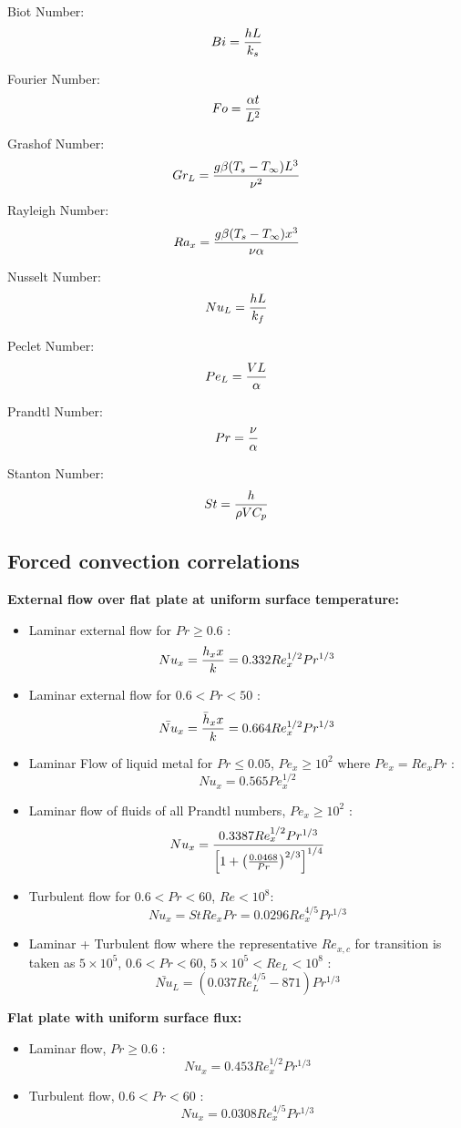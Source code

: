 Biot Number: $$ Bi = {h L \over k_s}$$

Fourier Number: $$Fo = {\alpha t \over L^2}$$

Grashof Number: $$Gr_L = {g \beta (T_s - T_\infty) L^3 \over \nu^2 }$$

Rayleigh Number: $$Ra_x = {g \beta (T_s - T_\infty) x^3 \over \nu \alpha}$$

Nusselt Number: $$Nu_L = {h L \over k_f}$$

Peclet Number: $$Pe_L = {V L \over \alpha}$$

Prandtl Number: $$Pr = {\nu \over \alpha}$$

Stanton Number: $$St = {h \over \rho V C_p}$$


\begin{center}
\section{Forced convection correlations}
\end{center}


{\bf External flow over flat plate at uniform surface temperature:}\\
\begin{itemize}
 \item Laminar external flow for $Pr \ge 0.6$ : 
      $$Nu_x = {h_x x \over k} = 0.332 Re_x^{1/2} Pr^{1/3}$$
 \item Laminar external flow for $0.6 < Pr < 50$ : 
      $$\bar{Nu}_x = {\bar{h}_x x \over k} = 0.664 Re_x^{1/2} Pr^{1/3}$$
 \item Laminar Flow of liquid metal for $Pr \le 0.05$, $Pe_x \ge 10^2$ where $Pe_x = Re_x Pr$ :
      $$ Nu_x = 0.565 Pe_x^{1/2} $$
 \item Laminar flow of fluids of all Prandtl numbers, $Pe_x \ge 10^2$ :
      $$ Nu_x = {0.3387 Re_x^{1/2} Pr^{1/3} \over \left[ 1 + \left( 0.0468 \over Pr \right)^{2/3} \right]^{1/4} } $$
 \item Turbulent flow for $0.6 < Pr < 60$, $Re < 10^8$:
      $$ Nu_x = St Re_x Pr = 0.0296 Re_x^{4/5} Pr^{1/3} $$
 \item Laminar + Turbulent flow where the representative $Re_{x,c}$ for transition is taken as $5 \times 10^5$, $0.6 < Pr < 60$, $5 \times 10^5 < Re_L < 10^8$ :
      $$ \bar{Nu}_L = \left( 0.037 Re_L^{4/5} - 871 \right) Pr^{1/3} $$
\end{itemize}


{\bf Flat plate with uniform surface flux:}\\
\begin{itemize}
 \item Laminar flow, $Pr \ge 0.6$ :
      $$ Nu_x = 0.453 Re_x^{1/2} Pr^{1/3} $$
 \item Turbulent flow, $ 0.6 < Pr < 60$ :
      $$ Nu_x = 0.0308 Re_x^{4/5} Pr^{1/3} $$
\end{itemize}


